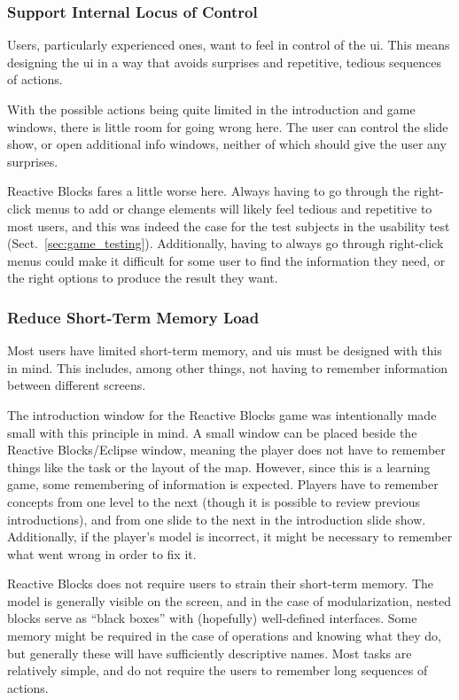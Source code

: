 \subsubsection{Support Internal Locus of Control}
Users, particularly experienced ones, want to feel in control of the \gls{ui}. This means designing the \gls{ui} in a way that avoids surprises and repetitive, tedious sequences of actions.

\noindent
With the possible actions being quite limited in the introduction and game windows, there is little room for going wrong here. The user can control the slide show, or open additional info windows, neither of which should give the user any surprises.

\noindent
Reactive Blocks fares a little worse here. Always having to go through the right-click menus to add or change elements will likely feel tedious and repetitive to most users, and this was indeed the case for the test subjects in the usability test (Sect.~\ref{sec:game_testing}). Additionally, having to always go through right-click menus could make it difficult for some user to find the information they need, or the right options to produce the result they want.

\subsubsection{Reduce Short-Term Memory Load}
Most users have limited short-term memory, and \glspl{ui} must be designed with this in mind. This includes, among other things, not having to remember information between different screens.

\noindent
The introduction window for the Reactive Blocks game was intentionally made small with this principle in mind. A small window can be placed beside the Reactive Blocks/Eclipse window, meaning the player does not have to remember things like the task or the layout of the map. However, since this is a learning game, some remembering of information is expected. Players have to remember concepts from one level to the next (though it is possible to review previous introductions), and from one slide to the next in the introduction slide show. Additionally, if the player's model is incorrect, it might be necessary to remember what went wrong in order to fix it.

\noindent
Reactive Blocks does not require users to strain their short-term memory. The model is generally visible on the screen, and in the case of modularization, nested blocks serve as ``black boxes'' with (hopefully) well-defined interfaces. Some memory might be required in the case of operations and knowing what they do, but generally these will have sufficiently descriptive names. Most tasks are relatively simple, and do not require the users to remember long sequences of actions.

